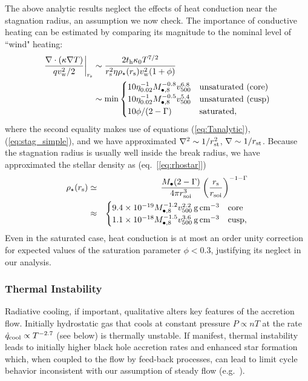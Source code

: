 \documentclass[usenatbib,fleqn]{mn2e}
\begin{document}
The above analytic results neglect the effects of heat conduction near the stagnation radius, an assumption we now check.  The importance of conductive heating can be estimated by comparing its magnitude to the nominal level of ``wind" heating:
\begin{align}
  \left.\frac{\nabla\cdot(\kappa \nabla T)}{q v_{\rm
w}^{2}/2}\right|_{r_{\rm s}} &\sim \frac{2t_{\rm h}\kappa_0
T^{7/2}}{r_{\rm s}^{2}\eta \rho_{\star}(r_{\rm s}) v_{\rm w}^{2}(1+\phi)}
\nonumber \\ &\sim {\rm min}
  \begin{cases}
  10 \eta_{0.02}^{-1}
M_{\bullet,8}^{-0.8} v_{500}^{6.8} &  \text{unsaturated (core)}\\
 10 \eta_{0.02}^{-1}
M_{\bullet,8}^{-0.5} v_{500}^{5.4} &  \text{unsaturated (cusp)}\\
  10 \phi/(2-\Gamma) & \text{saturated},
  \end{cases}
 \label{eq:rhors}
\end{align}
where the second equality makes use of equations (\ref{eq:Tanalytic}), (\ref{eq:stag_simple}), and we have approximated $\nabla^{2} \sim 1/r_{\rm st}^{2}$, $\nabla \sim 1/r_{\rm st}$.  Because the stagnation radius is usually well inside the break radius, we have approximated the stellar density as (eq.~[\ref{eq:rhostar}])
\begin{eqnarray}
  \rho_{\star}(r_{\rm s}) &\simeq& \frac{M_{\bullet}(2-\Gamma)}{4\pi r_{\rm soi}^{3}}\left(\frac{r_{\rm s}}{r_{\rm soi}}\right)^{-1-\Gamma} \nonumber \\
 &\approx& \begin{cases}
    9.4 \times 10^{-19}M_{\bullet,8}^{-1.2}v_{500}^{2.2}\,{\rm g\,cm^{-3}}
    & \text{core} \\
    1.1 \times 10^{-18} M_{\bullet,8}^{-1.5}v_{500}^{3.6}
    \,{\rm g\,cm^{-3}}  & \text{cusp}, 
  \end{cases}
  \label{eq:rhostarrs}
\end{eqnarray}
Even in the saturated case, heat conduction is at most an order unity correction for expected values of the saturation parameter $\phi < 0.3$, justifying its neglect in our analysis.  

\subsubsection{Thermal Instability}

Radiative cooling, if important, qualitative alters key features of the accretion flow.  Initially hydrostatic gas that cools at constant pressure $P \propto nT$ at the rate $\dot{q}_{\rm cool} \propto T^{-2.7}$ (see below) is thermally unstable.  If manifest, thermal instability leads to initially higher black hole accretion rates and enhanced star formation which, when coupled to the flow by feed-back processes, can lead to limit cycle behavior inconsistent with our assumption of steady flow (e.g.~\citealt{Wang+14}).  
\end{document}
